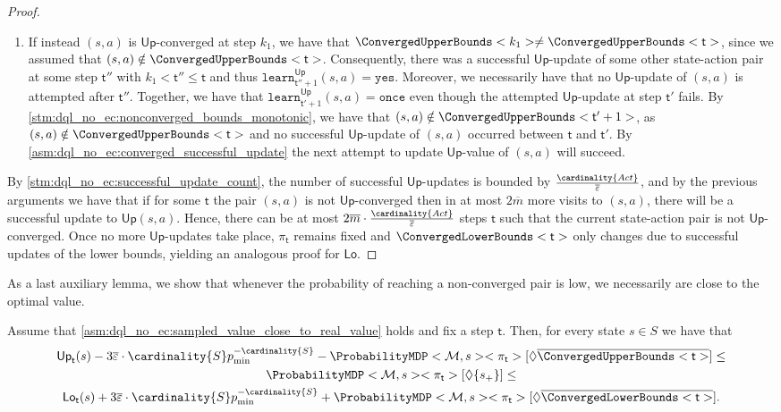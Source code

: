 \documentclass{theoretics}
\newcommand{\MDP}{\mathcal{M}}
\newcommand{\States}{S}
\newcommand{\Actions}{Act}
\newcommand{\strategy}{\pi}
\newcommand{\reach}{\Diamond}
\newcommand{\upperbound}{\mathsf{Up}}
\newcommand{\lowerbound}{\mathsf{Lo}}
\newcommand{\targetstate}{s_+}
\newcommand{\updatestep}{{\overline{\varepsilon}}}
\newcommand{\delay}{{\overline{m}}}
\newcommand{\learn}{\texttt{learn}}
\newcommand{\learnyes}{\texttt{yes}}
\newcommand{\learnonce}{\texttt{once}}
\newcommand{\algostep}{\mathsf{t}}
\begin{document}
\begin{proof}
\begin{enumerate}
\begin{enumerate}
			\item
			If instead $(s, a)$ is $\upperbound$-converged at step $k_1$, we have that $\ConvergedUpperBounds<k_1> \neq \ConvergedUpperBounds<\algostep>$, since we assumed that $(s, a) \notin \ConvergedUpperBounds<\algostep>$.
			Consequently, there was a successful $\upperbound$-update of some other state-action pair at some step $\algostep''$ with $k_1 < \algostep'' \leq \algostep$ and thus $\learn^\upperbound_{\algostep'' + 1}(s, a) = \learnyes$.
			Moreover, we necessarily have that no $\upperbound$-update of $(s, a)$ is attempted after $\algostep''$.
			Together, we have that $\learn^\upperbound_{\algostep' + 1}(s, a) = \learnonce$ even though the attempted $\upperbound$-update at step $\algostep'$ fails.
			By \cref{stm:dql_no_ec:nonconverged_bounds_monotonic}, we have that $(s, a) \notin \ConvergedUpperBounds<\algostep'+1>$, as $(s, a) \notin \ConvergedUpperBounds<\algostep>$ and no successful $\upperbound$-update of $(s, a)$ occurred between $\algostep$ and $\algostep'$.
			By \cref{asm:dql_no_ec:converged_successful_update} the next attempt to update $\upperbound$-value of $(s, a)$ will succeed.
		\end{enumerate}
	\end{enumerate}
	By \cref{stm:dql_no_ec:successful_update_count}, the number of successful $\upperbound$-updates is bounded by $\frac{\cardinality{\Actions}}{\updatestep}$, and by the previous arguments we have that if for some $\algostep$ the pair $(s, a)$ is not $\upperbound$-converged then in at most $2 \delay$ more visits to $(s, a)$, there will be a successful update to $\upperbound(s, a)$.
	Hence, there can be at most $2 \delay \cdot \frac{\cardinality{\Actions}}{\updatestep}$ steps $\algostep$ such that the current state-action pair is not $\upperbound$-converged.
	Once no more $\upperbound$-updates take place, $\strategy_\algostep$ remains fixed and $\ConvergedLowerBounds<\algostep>$ only changes due to successful updates of the lower bounds, yielding an analogous proof for $\lowerbound$. 
\end{proof}
As a last auxiliary lemma, we show that whenever the probability of reaching a non-converged pair is low, we necessarily are close to the optimal value.
\begin{lemma} \label{stm:dql_no_ec:bounds_close}
	Assume that \cref{asm:dql_no_ec:sampled_value_close_to_real_value} holds and fix a step $\algostep$.
	Then, for every state $s \in \States$ we have that
	\begin{gather*}
		\upperbound_\algostep(s) - 3 \updatestep \cdot \cardinality{\States} p_{\min}^{-\cardinality{\States}} - \ProbabilityMDP<\MDP, s><\strategy_\algostep>[\reach \overline{\ConvergedUpperBounds<\algostep>}] \leq \\
		\ProbabilityMDP<\MDP, s><\strategy_\algostep>[\reach \{\targetstate\}] \leq \\
		\lowerbound_\algostep(s) + 3 \updatestep \cdot \cardinality{\States} p_{\min}^{-\cardinality{\States}} + \ProbabilityMDP<\MDP, s><\strategy_\algostep>[\reach \overline{\ConvergedLowerBounds<\algostep>}].
	\end{gather*}
\end{lemma}
\end{document}

